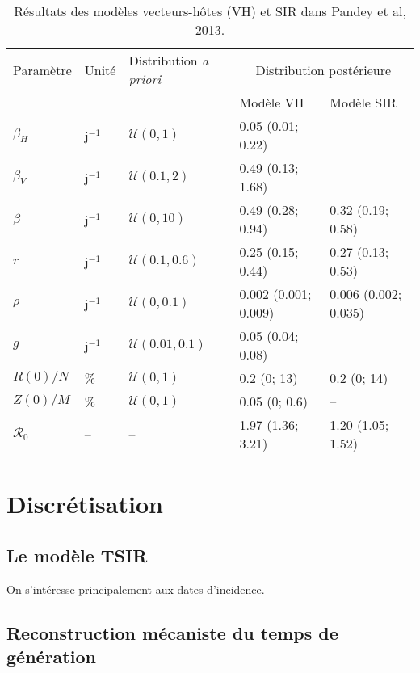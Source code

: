 \begin{table}[h]
\centering
\caption{Résultats des modèles vecteurs-hôtes (VH) et SIR dans Pandey et al, 2013. \vspace{.5em}}
\label{table:pandeyres}
\begin{tabular}{lllll}
\hline 
Paramètre & Unité & Distribution {\em a priori} &\multicolumn{2}{c}{Distribution postérieure}\\ 
&&& Modèle VH & Modèle SIR \\
\hline
$\beta_H$ 	& j$^{-1}$ & $\mathcal{U}(0,1)$ 		& 0.05 (0.01; 0.22) & -- \\
$\beta_V$ 	& j$^{-1}$ & $\mathcal{U}(0.1,2)$ 		& 0.49 (0.13; 1.68) & -- \\
$\beta$ 	& j$^{-1}$ & $\mathcal{U}(0,10)$ 		& 0.49 (0.28; 0.94) & 0.32 (0.19; 0.58) \\
$r$ 		& j$^{-1}$ & $\mathcal{U}(0.1,0.6)$ 		& 0.25 (0.15; 0.44) & 0.27 (0.13; 0.53)\\
$\rho$ 		& j$^{-1}$ & $\mathcal{U}(0,0.1)$ 		& 0.002 (0.001; 0.009) & 0.006 (0.002; 0.035) \\
$g$ 		& j$^{-1}$ & $\mathcal{U}(0.01,0.1)$ 		& 0.05 (0.04; 0.08) & -- \\
$R(0)/N$ 	& \% & $\mathcal{U}(0,1)$ 		& 0.2 (0; 13) & 0.2 (0; 14)\\
$Z(0)/M$ 	& \% & $\mathcal{U}(0,1)$ 		& 0.05 (0; 0.6) & -- \\
$\mathcal{R}_0$ & -- & --		 		& 1.97 (1.36; 3.21) & 1.20 (1.05; 1.52)\\
\hline 
\end{tabular} 
\end{table}







\section{Discrétisation}

\subsection{Le modèle TSIR}

On s'intéresse principalement aux dates d'incidence.

\subsection{Reconstruction mécaniste du temps de génération}

